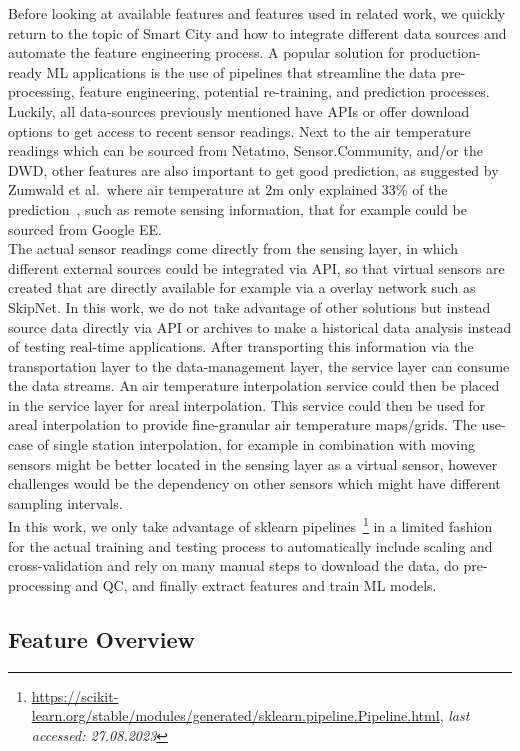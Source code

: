 Before looking at available features and features used in related work, we quickly return to the topic of Smart City and how to integrate different data sources and automate the feature engineering process. A popular solution for production-ready ML applications is the use of pipelines that streamline the data pre-processing, feature engineering, potential re-training, and prediction processes. Luckily, all data-sources previously mentioned have APIs or offer download options to get access to recent sensor readings. Next to the air temperature readings which can be sourced from Netatmo, Sensor.Community, and/or the DWD, other features are also important to get good prediction, as suggested by Zumwald et al.\ where air temperature at 2m only explained 33\% of the prediction~\cite{zumwald2021mapping}, such as remote sensing information, that for example could be sourced from Google EE.\\
The actual sensor readings come directly from the sensing layer, in which different external sources could be integrated via API, so that virtual sensors are created that are directly available for example via a overlay network such as SkipNet. In this work, we do not take advantage of other solutions but instead source data directly via API or archives to make a historical data analysis instead of testing real-time applications. After transporting this information via the transportation layer to the data-management layer, the service layer can consume the data streams. An air temperature interpolation service could then be placed in the service layer for areal interpolation. This service could then be used for areal interpolation to provide fine-granular air temperature maps/grids. The use-case of single station interpolation, for example in combination with moving sensors might be better located in the sensing layer as a virtual sensor, however challenges would be the dependency on other sensors which might have different sampling intervals.\\
In this work, we only take advantage of sklearn pipelines~\footnote{\url{https://scikit-learn.org/stable/modules/generated/sklearn.pipeline.Pipeline.html}, \textit{last accessed: 27.08.2023}} in a limited fashion for the actual training and testing process to automatically include scaling and cross-validation and rely on many manual steps to download the data, do pre-processing and QC, and finally extract features and train ML models.

\subsection{Feature Overview}

